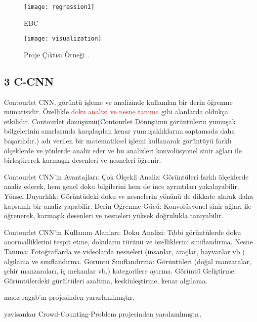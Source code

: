 \documentclass[10pt,a4paper]{report}
\begin{document}
\begin{justify}
	\begin{figure}[!ht]
		\raggedright
		\texttt{[image: regression1]}
		\caption{EBC \cite{idrees2018composition}}
		\label{Ornek_sonuc1}
	\end{figure}
	\clearpage
\begin{landscape} %
	
	\begin{figure}[p]
		\centering
		\texttt{[image: visualization]} %
		\caption{Proje Çıktısı Örneği \cite{ma2024clip}.}
	\end{figure}
	
\end{landscape}
	
\end{justify}
\subsection*{3 C-CNN}
\begin{justify}
 Contourlet CNN, görüntü işleme ve analizinde kullanılan bir derin öğrenme mimarisidir. Özellikle \textcolor{red}{doku analizi ve nesne tanıma} gibi alanlarda oldukça etkilidir. Contourlet dönüşümü(Contourlet Dönüşümü görüntülerin yumuşak bölgelerinin sınırlarında karşılaşılan kenar yumuşaklıklarını saptamada daha başarılıdır\cite{konuk2016hyperspectral}.) adı verilen bir matematiksel işlemi kullanarak görüntüyü farklı ölçeklerde ve yönlerde analiz eder ve bu analizleri konvolüsyonel sinir ağları ile birleştirerek karmaşık desenleri ve nesneleri öğrenir.\newline
 
 

Contourlet CNN'in Avantajları:
Çok Ölçekli Analiz: Görüntüleri farklı ölçeklerde analiz ederek, hem genel doku bilgilerini hem de ince ayrıntıları yakalayabilir.
Yönsel Duyarlılık: Görüntüdeki doku ve nesnelerin yönünü de dikkate alarak daha kapsamlı bir analiz yapabilir.
Derin Öğrenme Gücü: Konvolüsyonel sinir ağları ile öğrenerek, karmaşık desenleri ve nesneleri yüksek doğrulukla tanıyabilir.\newline

Contourlet CNN'in Kullanım Alanları:
Doku Analizi: Tıbbi görüntülerde doku anormalliklerini tespit etme, dokuların türünü ve özelliklerini sınıflandırma.
Nesne Tanıma: Fotoğraflarda ve videolarda nesneleri (insanlar, araçlar, hayvanlar vb.) algılama ve sınıflandırma.
Görüntü Sınıflandırma: Görüntüleri (doğal manzaralar, şehir manzaraları, iç mekanlar vb.) kategorilere ayırma.
Görüntü Geliştirme: Görüntülerdeki gürültüleri azaltma, keskinleştirme, kenar algılama.\newline


\raggedright maoz ragab'ın projesinden yararlanılmıştır\cite{ragab2021crowdcounting}.\newline

yavisankar Crowd-Counting-Problem projesinden yaralanılmıştır\cite{githubproject}.
\end{justify}
\end{document}
